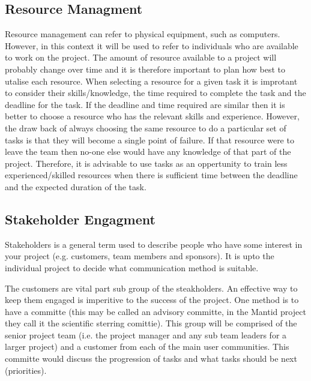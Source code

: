 \documentclass[jnr]{iosart2x}
\begin{document}
\subsection{Resource Managment}\label{rman}
Resource management can refer to physical equipment, such as computers.
However, in this context it will be used to refer to individuals who are available to work on the project.
The amount of resource available to a project will probably change over time and it is therefore important to plan how best to utalise each resource.
When selecting a resource for a given task it is improtant to consider their skills/knowledge, the time required to complete the task and the deadline for the task.
If the deadline and time required are similar then it is better to choose a resource who has the relevant skills and experience.
However, the draw back of always choosing the same resource to do a particular set of tasks is that they will become a single point of failure.
If that resource were to leave the team then no-one else would have any knowledge of that part of the project.
Therefore, it is advisable to use tasks as an oppertunity to train less experienced/skilled resources when there is sufficient time between the deadline and the expected duration of the task.

\subsection{Stakeholder Engagment}\label{se}
Stakeholders is a general term used to describe people who have some interest in your project (e.g. customers, team members and sponsors).
It is upto the individual project to decide what communication method is suitable.

The customers are vital part sub group of the steakholders.
An effective way to keep them engaged is imperitive to the success of the project.
One method is to have a committe (this may be called an advisory committe, in the Mantid project they call it the scientific sterring comittie).
This group will be comprised of the senior project team (i.e. the project manager and any sub team leaders for a larger project) and a customer from each of the main user communities.
This committe would discuss the progression of tasks and what tasks should be next (priorities).
\end{document}
